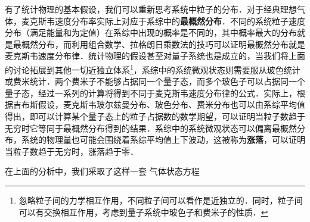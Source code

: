 有了统计物理的基本假设，我们可以重新思考系统中粒子的分布．对于经典理想气体，麦克斯韦速度分布率实际上对应于系综中的\textbf{最概然分布}．不同的系统粒子速度分布（满足能量和为定值）在系综中出现的概率是不同的，其中概率最大的分布就是最概然分布，而利用组合数学、拉格朗日乘数法的技巧可以证明最概然分布就是麦克斯韦速度分布律．统计物理的假设甚至对量子系统也是成立的，当我们将上面的讨论拓展到其他一切近独立体系\footnote{忽略粒子间的力学相互作用，不同粒子间可以看作是近独立的．同时，粒子间可以有交换相互作用，考虑到量子系统中玻色子和费米子的性质．}，系综中的系统微观状态则需要服从玻色统计或费米统计．两个费米子不能够占据同一个量子态，而多个玻色子可以占据同一个量子态，经过一系列的计算将得到不同于麦克斯韦速度分布律的公式．实际上，根据吉布斯假设，麦克斯韦玻尔兹曼分布、玻色分布、费米分布也可以由系综平均值得出，即可以计算某个量子态上的粒子占据数的数学期望，可以证明当粒子数趋于无穷时它等同于最概然分布得到的结果．系综中的系统微观状态可以偏离最概然分布，系统的物理量也可能会围绕着系综平均值上下波动，这被称为\textbf{涨落}，可以证明当粒子数趋于无穷时，涨落趋于零．

在上面的分析中，我们采取了这样一套
气体状态方程